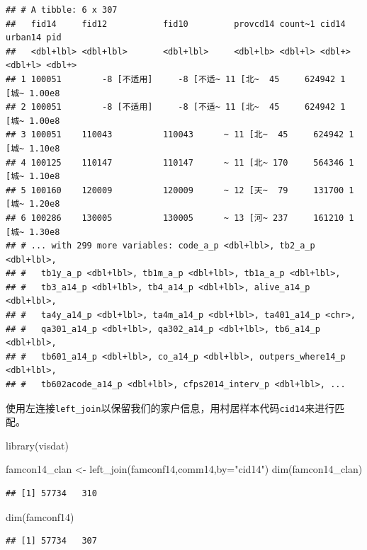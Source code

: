 \documentclass[
  oneside]{book}
\newenvironment{Shaded}{\begin{snugshade}}{\end{snugshade}}
\newcommand{\AttributeTok}[1]{\textcolor[rgb]{0.77,0.63,0.00}{#1}}
\newcommand{\FunctionTok}[1]{\textcolor[rgb]{0.00,0.00,0.00}{#1}}
\newcommand{\NormalTok}[1]{#1}
\newcommand{\OtherTok}[1]{\textcolor[rgb]{0.56,0.35,0.01}{#1}}
\newcommand{\StringTok}[1]{\textcolor[rgb]{0.31,0.60,0.02}{#1}}
\begin{document}
\begin{verbatim}
## # A tibble: 6 x 307
##   fid14     fid12           fid10         provcd14 count~1 cid14  urban14 pid   
##   <dbl+lbl> <dbl+lbl>       <dbl+lbl>     <dbl+lb> <dbl+l> <dbl+> <dbl+l> <dbl+>
## 1 100051        -8 [不适用]     -8 [不适~ 11 [北~  45     624942 1 [城~ 1.00e8
## 2 100051        -8 [不适用]     -8 [不适~ 11 [北~  45     624942 1 [城~ 1.00e8
## 3 100051    110043          110043      ~ 11 [北~  45     624942 1 [城~ 1.10e8
## 4 100125    110147          110147      ~ 11 [北~ 170     564346 1 [城~ 1.10e8
## 5 100160    120009          120009      ~ 12 [天~  79     131700 1 [城~ 1.20e8
## 6 100286    130005          130005      ~ 13 [河~ 237     161210 1 [城~ 1.30e8
## # ... with 299 more variables: code_a_p <dbl+lbl>, tb2_a_p <dbl+lbl>,
## #   tb1y_a_p <dbl+lbl>, tb1m_a_p <dbl+lbl>, tb1a_a_p <dbl+lbl>,
## #   tb3_a14_p <dbl+lbl>, tb4_a14_p <dbl+lbl>, alive_a14_p <dbl+lbl>,
## #   ta4y_a14_p <dbl+lbl>, ta4m_a14_p <dbl+lbl>, ta401_a14_p <chr>,
## #   qa301_a14_p <dbl+lbl>, qa302_a14_p <dbl+lbl>, tb6_a14_p <dbl+lbl>,
## #   tb601_a14_p <dbl+lbl>, co_a14_p <dbl+lbl>, outpers_where14_p <dbl+lbl>,
## #   tb602acode_a14_p <dbl+lbl>, cfps2014_interv_p <dbl+lbl>, ...
\end{verbatim}

使用左连接\texttt{left\_join}以保留我们的家户信息，用村居样本代码\texttt{cid14}来进行匹配。

\begin{Shaded}
\begin{Highlighting}[]
\FunctionTok{library}\NormalTok{(visdat)}

\NormalTok{famcon14\_clan }\OtherTok{\textless{}{-}} \FunctionTok{left\_join}\NormalTok{(famconf14,comm14,}\AttributeTok{by=}\StringTok{"cid14"}\NormalTok{)}
\FunctionTok{dim}\NormalTok{(famcon14\_clan)}
\end{Highlighting}
\end{Shaded}

\begin{verbatim}
## [1] 57734   310
\end{verbatim}

\begin{Shaded}
\begin{Highlighting}[]
\FunctionTok{dim}\NormalTok{(famconf14)}
\end{Highlighting}
\end{Shaded}

\begin{verbatim}
## [1] 57734   307
\end{verbatim}
\end{document}
